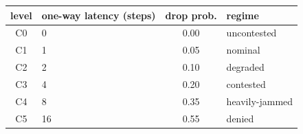 \begin{tabular}{clcl}
\toprule
level & one-way latency (steps) & drop prob. & regime \\
\midrule
C0 & 0 & 0.00 & uncontested \\
C1 & 1 & 0.05 & nominal \\
C2 & 2 & 0.10 & degraded \\
C3 & 4 & 0.20 & contested \\
C4 & 8 & 0.35 & heavily-jammed \\
C5 & 16 & 0.55 & denied \\
\bottomrule
\end{tabular}
